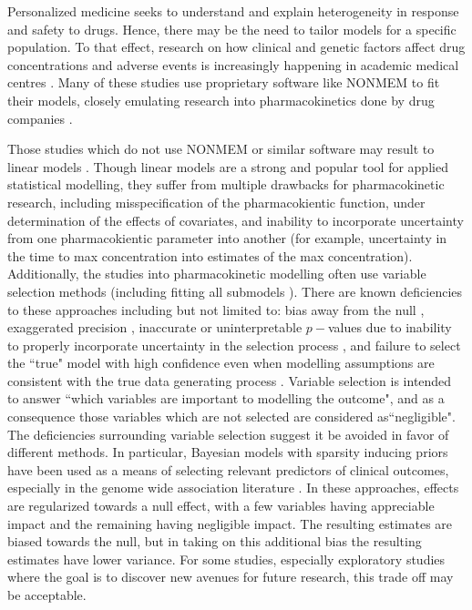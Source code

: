 Personalized medicine seeks to understand and explain heterogeneity in response and safety to drugs.  Hence, there may be the need to tailor models for a specific population.  To that effect, research on how clinical and genetic factors affect drug concentrations and adverse events is increasingly happening in academic medical centres  \cite{gibert_development_2022, gulilat_association_2022, peretz_pharmacokinetics_2021, gulilat_drug_2020, sturkenboom_population_2021}.  Many of these studies use proprietary software like NONMEM \cite{bauer2011nonmem} to fit their models, closely emulating research into pharmacokinetics done by drug companies \cite{cirincione2018population,ueshima2018population}.  

Those studies which do not use NONMEM or similar software may result to linear models \cite{gulilat2020drug}.  Though linear models are a strong and popular tool for applied statistical modelling, they suffer from multiple drawbacks for pharmacokinetic research, including misspecification of the pharmacokientic function, under determination of the effects of covariates, and inability to incorporate uncertainty from one pharmacokientic parameter into another (for example, uncertainty in the time to max concentration into estimates of the max concentration).  Additionally, the studies into pharmacokinetic modelling often use variable selection methods (including fitting all submodels \cite{cirincione2018population,ueshima2018population}).  There are known deficiencies to these approaches including but not limited to: bias away from the null \cite{whittingham2006we}, exaggerated precision \cite{altman1989bootstrap}, inaccurate or uninterpretable $p-$values due to inability to properly incorporate uncertainty in the selection process \cite{harrell2015regression}, and failure to select the ``true" model with high confidence even when modelling assumptions are consistent with the true data generating process \cite{smith2018step}.  Variable selection is intended to answer ``which variables are important to modelling the outcome", and as a consequence those variables which are not selected are considered as``negligible".  The deficiencies surrounding variable selection suggest it be avoided in favor of different methods.  In particular, Bayesian models with sparsity inducing priors have been used as a means of selecting relevant predictors of clinical outcomes, especially in the genome wide association literature \cite{ni2019bayesian, armero2019two, zhou2013polygenic}.  In these approaches, effects are regularized towards a null effect, with a few variables having appreciable impact and the remaining having negligible impact. The resulting estimates are biased towards the null, but in taking on this additional bias the resulting estimates have lower variance.  For some studies, especially exploratory studies where the goal is to discover new avenues for future research, this trade off may be acceptable.

